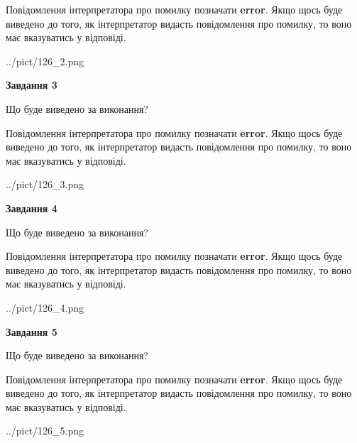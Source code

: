 \documentclass[12pt, ukrainian]{article}
\begin{document}
{\begin {large}
Повідомлення інтерпретатора про помилку позначати \textbf{error}.
Якщо щось буде виведено до того, як інтерпретатор видасть повідомлення про помилку, 
то воно має вказуватись у відповіді. \par


\begin{center}
	{../pict/126_2.png}
\end{center}
\newpage

{\begin {center}\textbf{Завдання 3}\end {center}}\par
Що буде виведено за виконання?

Повідомлення інтерпретатора про помилку позначати \textbf{error}.
Якщо щось буде виведено до того, як інтерпретатор видасть повідомлення про помилку, 
то воно має вказуватись у відповіді. \par


\begin{center}
	{../pict/126_3.png}
\end{center}
\newpage

{\begin {center}\textbf{Завдання 4}\end {center}}\par
Що буде виведено за виконання?

Повідомлення інтерпретатора про помилку позначати \textbf{error}.
Якщо щось буде виведено до того, як інтерпретатор видасть повідомлення про помилку, 
то воно має вказуватись у відповіді. \par


\begin{center}
	{../pict/126_4.png}
\end{center}
\newpage

{\begin {center}\textbf{Завдання 5}\end {center}}\par
Що буде виведено за виконання?

Повідомлення інтерпретатора про помилку позначати \textbf{error}.
Якщо щось буде виведено до того, як інтерпретатор видасть повідомлення про помилку, 
то воно має вказуватись у відповіді. \par


\begin{center}
	{../pict/126_5.png}
\end{center}
\newpage


\end{large}}
\end{document}
